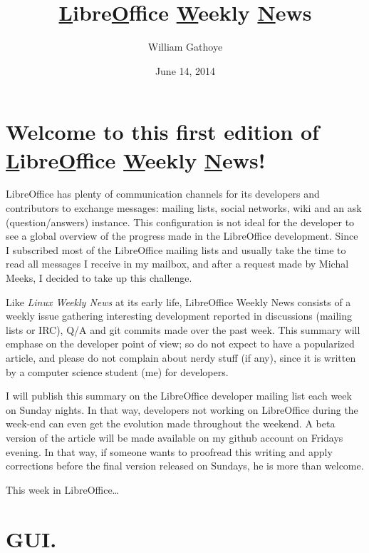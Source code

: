 \documentclass{article}
\begin{document}
\title{\underline{L}ibre\underline{O}ffice \underline{W}eekly \underline{N}ews}
\author{William Gathoye}
\date{June 14, 2014}
\maketitle



\section{\texorpdfstring{Welcome to this first edition of
\underline{L}ibre\underline{O}ffice \underline{W}eekly
\underline{N}ews!}{}}

LibreOffice has plenty of communication channels for its developers and
contributors to exchange messages: mailing lists, social networks, wiki and an
ask (question/answers) instance. This configuration is not ideal for the
developer to see a global overview of the progress made in the LibreOffice
development. Since I subscribed most of the LibreOffice mailing lists and
usually take the time to read all messages I receive in my mailbox, and after
a request made by Michal Meeks, I decided to take up this challenge.

Like \emph{Linux Weekly News} at its early life, LibreOffice Weekly News
consists of a weekly issue gathering interesting development reported in
discussions (mailing lists or IRC), Q/A and git commits made over the past
week. This summary will emphase on the developer point of view; so do not
expect to have a popularized article, and please do not complain about nerdy
stuff (if any), since it is written by a computer science student (me) for
developers. 

I will publish this summary on the LibreOffice developer mailing list each week
on Sunday nights. In that way, developers not working on LibreOffice during the
week-end can even get the evolution made throughout the weekend. A beta version
of the article will be made available on my github account\cite{wgetGithub} on
Fridays evening. In that way, if someone wants to proofread this writing and
apply corrections before the final version released on Sundays, he is more than
welcome.

This week in LibreOffice\ldots



\section{GUI.}
\end{document}
